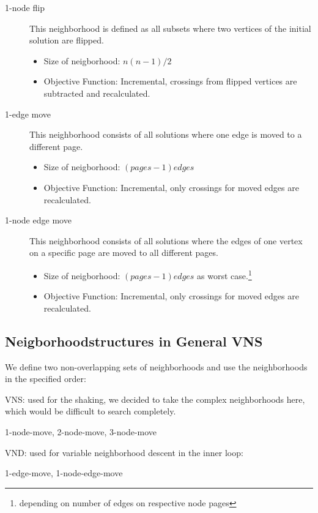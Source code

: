 \documentclass{scrartcl}
\begin{document}
\begin{description}
\item[1-node flip] 
    
    This neighborhood is defined as all subsets where two vertices of the initial solution are flipped.
    \begin{itemize}
        \item Size of neigborhood: $n(n-1)/2$
        \item Objective Function: Incremental, crossings from flipped vertices are subtracted and recalculated.

    \end{itemize}

	
\item[1-edge move] This neighborhood consists of all solutions where one edge is moved to a different page. 
     \begin{itemize}
        \item Size of neigborhood: $(pages-1) edges$ 
        \item Objective Function: Incremental, only crossings for moved edges are recalculated.
    \end{itemize}
   
	
\item[1-node edge move] This neighborhood consists of all solutions where the edges of
	one vertex on a specific page are moved to all different pages. 

    \begin{itemize}
        \item Size of neigborhood: $(pages-1) edges$ as worst case.\footnote{depending on number of edges on respective node pages}
        \item Objective Function: Incremental, only crossings for moved edges are recalculated.
    \end{itemize}
    

\end{description}



\subsection{Neigborhoodstructures in General VNS}
We define two non-overlapping sets of neighborhoods and use the
neighborhoods in the specified order:

\begin{description}

    \item{VNS}: used for the shaking, we decided to take the complex
      neighborhoods here, which would be difficult to search
      completely.
                
                1-node-move, 2-node-move, 3-node-move
                
    \item{VND}: used for variable neighborhood descent in the inner loop:
         
                1-edge-move, 1-node-edge-move

\end{description}
\end{document}
